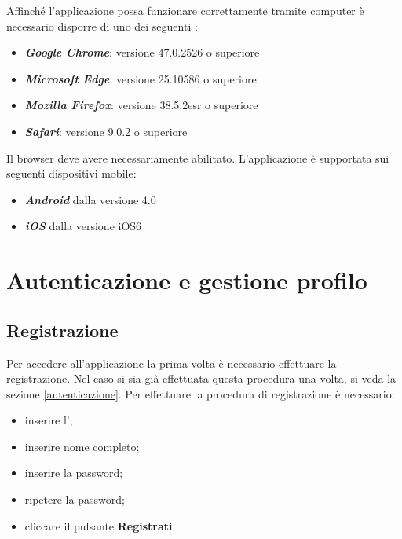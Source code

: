 \documentclass[12pt,a4paper]{article}
\begin{document}
	Affinché l’applicazione possa funzionare correttamente tramite computer  è necessario disporre di uno dei seguenti :
	\begin{itemize}
		\item \textit{\textbf{Google Chrome}}: versione  47.0.2526 o superiore
		\item \textit{\textbf{Microsoft Edge}}: versione 25.10586 o superiore
	\item \textit{\textbf{Mozilla Firefox}}: versione 38.5.2esr o superiore
	\item\textit{\textbf{Safari}}: versione 9.0.2 o superiore
	\end{itemize}
Il browser deve avere necessariamente  abilitato.  L'applicazione è supportata sui seguenti dispositivi mobile:
	\begin{itemize}
	\item \textit{\textbf{Android}} dalla versione 4.0
	\item \textit{\textbf{iOS}} dalla versione iOS6
\end{itemize}

	\newpage
	\section{Autenticazione e gestione profilo}
	\subsection{Registrazione}\label{registrazione}
	Per accedere all'applicazione la prima volta è necessario effettuare la registrazione. Nel caso si sia già effettuata questa procedura una volta, si veda la sezione \ref{autenticazione}.
	Per effettuare la procedura di registrazione è necessario:
	\begin{itemize}
		\item inserire l';
		\item inserire nome completo;
		\item inserire la password;
		\item ripetere la password;
		\item cliccare il pulsante \textbf{Registrati}. 
	\end{itemize}
\end{document}
